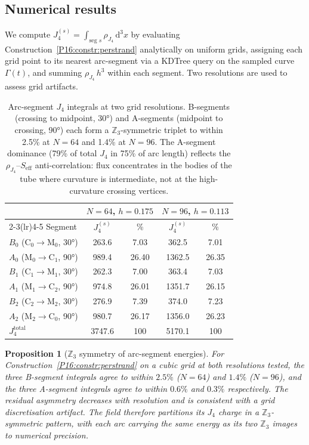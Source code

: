 \documentclass[11pt,a4paper]{article}
\newtheorem{proposition}[theorem]{Proposition}
\theoremstyle{definition}\newtheorem{definition}[theorem]{Definition}
\theoremstyle{remark}
\theoremstyle{definition}\newtheorem{construction}[theorem]{Construction}
\begin{document}
\subsection{Numerical results}
\label{P16:sec:arcseg_numerics}

We compute $J_4^{(s)} = \int_{\text{seg }s} \rho_{J_4}\,\mathrm{d}^3x$
by evaluating Construction~\ref{P16:constr:perstrand} analytically on uniform grids, assigning
each grid point to its nearest arc-segment via a KDTree query on the
sampled curve $\Gamma(t)$, and summing $\rho_{J_4}\,h^3$ within each
segment.  Two resolutions are used to assess grid artifacts.

\begin{table}[h]
\centering
\begin{tabular}{lcccc}
\toprule
 & \multicolumn{2}{c}{$N=64$, $h=0.175$} & \multicolumn{2}{c}{$N=96$, $h=0.113$}\\
\cmidrule(lr){2-3}\cmidrule(lr){4-5}
Segment & $J_4^{(s)}$ & \% & $J_4^{(s)}$ & \% \\
\midrule
$B_0$ (C$_0\to$M$_0$, 30°) & 263.6 & 7.03 & 362.5 & 7.01 \\
$A_0$ (M$_0\to$C$_1$, 90°) & 989.4 & 26.40 & 1362.5 & 26.35 \\
$B_1$ (C$_1\to$M$_1$, 30°) & 262.3 & 7.00 & 363.4 & 7.03 \\
$A_1$ (M$_1\to$C$_2$, 90°) & 974.8 & 26.01 & 1351.7 & 26.15 \\
$B_2$ (C$_2\to$M$_2$, 30°) & 276.9 & 7.39 & 374.0 & 7.23 \\
$A_2$ (M$_2\to$C$_0$, 90°) & 980.7 & 26.17 & 1356.0 & 26.23 \\
\midrule
$J_4^{\text{total}}$ & 3747.6 & 100 & 5170.1 & 100 \\
\bottomrule
\end{tabular}
\caption{Arc-segment $J_4$ integrals at two grid resolutions.
  B-segments (crossing to midpoint, 30°) and A-segments (midpoint to
  crossing, 90°) each form a $\mathbb{Z}_3$-symmetric triplet to within
  2.5\% at $N=64$ and 1.4\% at $N=96$.  The A-segment dominance
  (79\% of total $J_4$ in 75\% of arc length) reflects the
  $\rho_{J_4}$--$S_{\mathrm{eff}}$ anti-correlation: flux concentrates
  in the bodies of the tube where curvature is intermediate, not at
  the high-curvature crossing vertices.}
\label{P16:tab:arc_segments}
\end{table}

\begin{proposition}[$\mathbb{Z}_3$ symmetry of arc-segment energies]
\label{P16:prop:z3_symmetry}
For Construction~\ref{P16:constr:perstrand} on a cubic grid at both resolutions tested, the
three B-segment integrals agree to within $2.5\%$ ($N=64$) and $1.4\%$
($N=96$), and the three A-segment integrals agree to within $0.6\%$
and $0.3\%$ respectively.  The residual asymmetry decreases with
resolution and is consistent with a grid discretisation artifact.
The field therefore partitions its $J_4$ charge in a $\mathbb{Z}_3$-symmetric
pattern, with each arc carrying the same energy as its two $\mathbb{Z}_3$
images to numerical precision.
\end{proposition}
\end{document}
